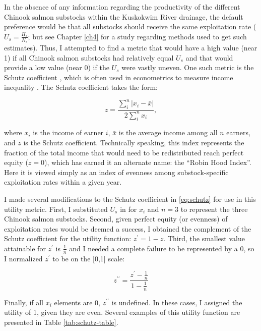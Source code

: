 \documentclass[12pt,]{book}
\theoremstyle{definition}
\theoremstyle{definition}
\theoremstyle{definition}
\theoremstyle{remark}
\begin{document}
\noindent
In the absence of any information regarding the productivity of the
different Chinook salmon substocks within the Kuskokwim River drainage,
the default preference would be that all substocks should receive the
same exploitation rate (\(U_s = \frac{H_s}{N_s}\); but see Chapter
\ref{ch4} for a study regarding methods used to get such estimates).
Thus, I attempted to find a metric that would have a high value (near 1)
if all Chinook salmon substocks had relatively equal \(U_s\) and that
would provide a low value (near 0) if the \(U_s\) were vastly uneven.
One such metric is the Schutz coefficient
\citep{schutz-1951, habib-2012}, which is often used in econometrics to
measure income inequality \citep[e.g.,][]{kennedy-etal-1996}. The Schutz
coefficient takes the form:

\begin{equation}
  z = \frac{\sum_i^n|x_i-\bar{x}|}{2\sum_i^nx_i},
  \label{eq:schutz}
\end{equation}

\noindent
where \(x_i\) is the income of earner \(i\), \(\bar{x}\) is the average
income among all \(n\) earners, and \(z\) is the Schutz coefficient.
Technically speaking, this index represents the fraction of the total
income that would need to be redistributed reach perfect equity
(\(z = 0\)), which has earned it an alternate name: the ``Robin Hood
Index''. Here it is viewed simply as an index of evenness among
substock-specific exploitation rates within a given year.

I made several modifications to the Schutz coefficient in
\eqref{eq:schutz} for use in this utility metric. First, I substituted
\(U_s\) in for \(x_i\) and \(n=3\) to represent the three Chinook salmon
substocks. Second, given perfect equity (or evenness) of exploitation
rates would be deemed a success, I obtained the complement of the Schutz
coefficient for the utility function: \(z^\prime = 1 - z\). Third, the
smallest value attainable for \(z^\prime\) is \(\frac{1}{n}\) and I
needed a complete failure to be represented by a 0, so I normalized
\(z^\prime\) to be on the {[}0,1{]} scale:

\begin{equation}
  z^{\prime\prime} = \frac{z^\prime-\frac{1}{n}}{1 - \frac{1}{n}}
  \label{eq:mod-schutz}
\end{equation}

\noindent
Finally, if all \(x_i\) elements are 0, \(z^{\prime\prime}\) is
undefined. In these cases, I assigned the utility of 1, given they are
even. Several examples of this utility function are presented in Table
\ref{tab:schutz-table}.
\end{document}
